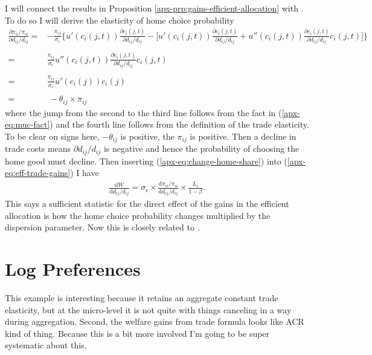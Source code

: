 \documentclass[12pt,pdftex]{article}
\begin{document}
\begin{onehalfspacing}
I will connect the results in Proposition \ref{apx-prp:gains-efficient-allocation} with \citet{arkolakis2012new}. To do so I will derive the elasticity of home choice probability
\begin{align}
\frac{\partial \pi_{ii} / \pi_{ii}}{\partial d_{ij} / d_{ij}} =& -\frac{\pi_{ij}}{\sigma_{\epsilon}} \bigg \{ u'(c_{i}(j,t))\frac{\partial c_{i}(j,t)}{\partial d_{ij} / d_{ij}} - \bigg [u'(c_{i}(j,t))\frac{\partial c_{i}(j,t)}{\partial d_{ij} / d_{ij}} + u''(c_{i}(j,t))\frac{\partial c_{i}(j,t)}{\partial d_{ij} / d_{ij}}c_{i}(j,t) \bigg ] \bigg \} \\
\nonumber \\
=& \frac{\pi_{ij}}{\sigma_{\epsilon}}u''(c_{i}(j,t))\frac{\partial c_{i}(j,t)}{\partial d_{ij} / d_{ij}}c_{i}(j,t) \\
\nonumber \\
=& \frac{\pi_{ij}}{\sigma_{\epsilon}} u'(c_{i}(j)) c_{i}(j) \\
\nonumber \\
=& \ - \theta_{ij} \times \pi_{ij} \label{apx-eq:change-home-share}
\end{align}
where the jump from the second to the third line follows from the fact in (\ref{apx-eq:muc-fact}) and the fourth line follows from the definition of the trade elasticity. To be clear on signs here, $-\theta_{ij}$ is positive, the $\pi_{ij}$ is positive. Then a decline in trade costs means $\partial d_{ij} / d_{ij}$ is negative and hence the probability of choosing the home good must decline.  Then inserting (\ref{apx-eq:change-home-share}) into  (\ref{apx-eq:eff-trade-gains}) I have
\begin{align}
\frac{\mathrm{d} W}{\mathrm{d} d_{ij} / d_{ij}} =  \sigma_{\epsilon} \times \frac{\mathrm{d} \pi_{ii} / \pi_{ii}}{\mathrm{d} d_{ij} / d_{ij}} \times \frac{L_i}{1 - \beta}.
\label{apx-eq:eff-trade-gains}
\end{align}
This says a sufficient statistic for the direct effect of the gains in the efficient allocation is how the home choice probability changes multiplied by the dispersion parameter. Now this is closely related to \citet{arkolakis2012new}.

\newpage


\section{Log Preferences}\label{apx-sec:log-preferences}

This example is interesting because it retains an aggregate constant trade elasticity, but at the micro-level it is not quite with things canceling in a way during aggregation. Second, the welfare gains from trade formula looks like ACR kind of thing. Because this is a bit more involved I'm going to be super systematic about this.


\end{onehalfspacing}
\end{document}
